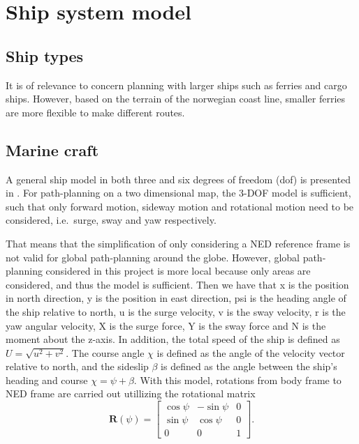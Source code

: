 \section{Ship system model}

\subsection{Ship types}

It is of relevance to concern planning with larger ships such as ferries and cargo ships. However, based on the terrain of the norwegian coast line, smaller ferries are more flexible to make different routes. 

\subsection{Marine craft}
A general ship model in both three and six degrees of freedom (\gls{dof}) is presented in \parencite{fossen2011}. For path-planning on a two dimensional map, the 3-DOF model is sufficient, such that only forward motion, sideway motion and rotational motion need to be considered, i.e.\ surge, sway and yaw respectively.



That means that the simplification of only considering a NED reference frame is not valid for global path-planning around the globe. However, global path-planning considered in this project is more local because only areas are considered, and thus the model is sufficient. Then we have that \gls{x} is the position in north direction, \gls{y} is the position in east direction, \gls{psi} is the heading angle of the ship relative to north, \gls{u} is the surge velocity, \gls{v} is the sway velocity, \gls{r} is the yaw angular velocity, \gls{X} is the surge force, \gls{Y} is the sway force and \gls{N} is the moment about the z-axis. In addition, the total speed of the ship is defined as $U=\sqrt{u^2+v^2}$. The course angle $\chi$ is defined as the angle of the velocity vector relative to north, and the sideslip $\beta$ is defined as the angle between the ship's heading and course $\chi = \psi + \beta$. With this model, rotations from body frame to NED frame are carried out utillizing the rotational matrix
\begin{equation}
\boldsymbol{R}(\psi) = \begin{bmatrix} 
\cos\psi &-\sin\psi & 0 \\
\sin\psi & \cos\psi & 0 \\
0 & 0 & 1
\end{bmatrix}.
\end{equation}



